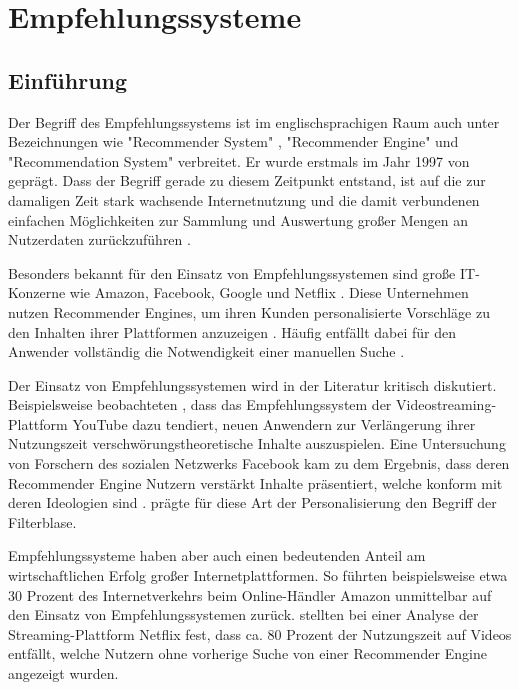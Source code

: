 
\chapter{Empfehlungssysteme}
\label{ch:empfehlungssysteme}

\section{Einführung}
\label{ch:empfehlungssysteme:einfuehrung}
Der Begriff des Empfehlungssystems ist im englischsprachigen Raum auch unter Bezeichnungen wie "Recommender System" \cite[S. 1]{lu:2015}, "Recommender Engine" \cite[S. 1]{panigrahi:2016} und "Recommendation System" \cite[S. 1]{ebesu:2018} verbreitet. Er wurde erstmals im Jahr 1997 von \textcite[S. 1]{resnick:1997} geprägt. Dass der Begriff gerade zu diesem Zeitpunkt entstand, ist auf die zur damaligen Zeit stark wachsende Internetnutzung und die damit verbundenen einfachen Möglichkeiten zur Sammlung und Auswertung großer Mengen an Nutzerdaten zurückzuführen \cite[S. xvii]{recommenderSystems:2016}.

Besonders bekannt für den Einsatz von Empfehlungssystemen sind große IT-Konzerne wie Amazon, Facebook, Google und Netflix \cite[S. 1]{zarzour:2018}. Diese Unternehmen nutzen Recommender Engines, um ihren Kunden personalisierte Vorschläge zu den Inhalten ihrer Plattformen anzuzeigen \cite[S. 2]{jeckmans:2013}. Häufig entfällt dabei für den Anwender vollständig die Notwendigkeit einer manuellen Suche \cite[S. 1]{comibingCareer:2013}.

Der Einsatz von Empfehlungssystemen wird in der Literatur kritisch diskutiert. Beispielsweise beobachteten \textcite[S. 17f.]{alfano:2020}, dass das Empfehlungssystem der Videostreaming-Plattform YouTube dazu tendiert, neuen Anwendern zur Verlängerung ihrer Nutzungszeit verschwörungstheoretische Inhalte auszuspielen. Eine Untersuchung von Forschern des sozialen Netzwerks Facebook kam zu dem Ergebnis, dass deren Recommender Engine Nutzern verstärkt Inhalte präsentiert, welche konform mit deren Ideologien sind \cite[S. 2]{bakshy:2015}. \textcite[S. 1ff.]{pariser:2012} prägte für diese Art der Personalisierung den Begriff der Filterblase.

Empfehlungssysteme haben aber auch einen bedeutenden Anteil am wirtschaftlichen Erfolg großer Internetplattformen. So führten beispielsweise \textcite[S. 6f.]{sharma:2015} etwa 30 Prozent des Internetverkehrs beim Online-Händler Amazon unmittelbar auf den Einsatz von Empfehlungssystemen zurück. \textcite[S. 5]{gomezuribe:2016} stellten bei einer Analyse der Streaming-Plattform Netflix fest, dass ca. 80 Prozent der Nutzungszeit auf Videos entfällt, welche Nutzern ohne vorherige Suche von einer Recommender Engine angezeigt wurden.

